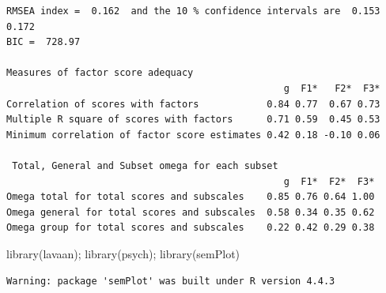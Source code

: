 \documentclass[
  letterpaper,
  DIV=11,
  numbers=noendperiod]{scrartcl}
\newenvironment{Shaded}{\begin{snugshade}}{\end{snugshade}}
\newcommand{\AttributeTok}[1]{\textcolor[rgb]{0.40,0.45,0.13}{#1}}
\newcommand{\ConstantTok}[1]{\textcolor[rgb]{0.56,0.35,0.01}{#1}}
\newcommand{\DecValTok}[1]{\textcolor[rgb]{0.68,0.00,0.00}{#1}}
\newcommand{\FunctionTok}[1]{\textcolor[rgb]{0.28,0.35,0.67}{#1}}
\newcommand{\NormalTok}[1]{\textcolor[rgb]{0.00,0.23,0.31}{#1}}
\newcommand{\OtherTok}[1]{\textcolor[rgb]{0.00,0.23,0.31}{#1}}
\newcommand{\SpecialCharTok}[1]{\textcolor[rgb]{0.37,0.37,0.37}{#1}}
\newcommand{\StringTok}[1]{\textcolor[rgb]{0.13,0.47,0.30}{#1}}
\begin{document}
\begin{verbatim}
RMSEA index =  0.162  and the 10 % confidence intervals are  0.153 0.172
BIC =  728.97 

Measures of factor score adequacy             
                                                 g  F1*   F2*  F3*
Correlation of scores with factors            0.84 0.77  0.67 0.73
Multiple R square of scores with factors      0.71 0.59  0.45 0.53
Minimum correlation of factor score estimates 0.42 0.18 -0.10 0.06

 Total, General and Subset omega for each subset
                                                 g  F1*  F2*  F3*
Omega total for total scores and subscales    0.85 0.76 0.64 1.00
Omega general for total scores and subscales  0.58 0.34 0.35 0.62
Omega group for total scores and subscales    0.22 0.42 0.29 0.38
\end{verbatim}

\begin{Shaded}
\begin{Highlighting}[]
\FunctionTok{library}\NormalTok{(lavaan); }\FunctionTok{library}\NormalTok{(psych); }\FunctionTok{library}\NormalTok{(semPlot)}
\end{Highlighting}
\end{Shaded}

\begin{verbatim}
Warning: package 'semPlot' was built under R version 4.4.3
\end{verbatim}

\begin{Shaded}
\end{Shaded}
\end{document}
